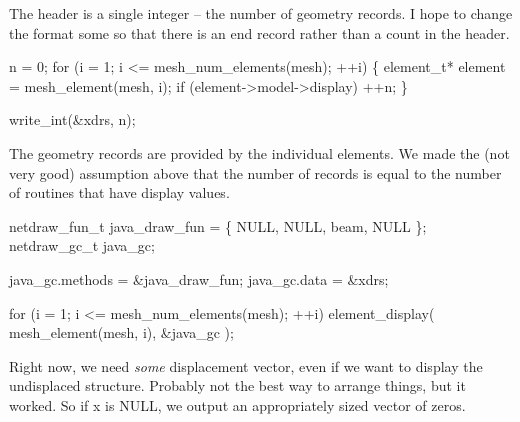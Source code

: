 The header is a single integer -- the number of geometry records.
I hope to change the format some so that there is an end record
rather than a count in the header.

\nwenddocs{}\endmoddef\nwstartdeflinemarkup{}\nwenddeflinemarkup
n = 0;
for (i = 1; i <= mesh_num_elements(mesh); ++i) \{
    element_t* element = mesh_element(mesh, i);
    if (element->model->display)
        ++n;
\}

write_int(&xdrs, n);

\nwendcode{}\nwdocspar

The geometry records are provided by the individual elements.
We made the (not very good) assumption above that the number
of records is equal to the number of routines that have display
values.

\nwenddocs{}\endmoddef\nwstartdeflinemarkup{}\nwenddeflinemarkup
netdraw_fun_t java_draw_fun = \{ NULL, NULL, beam, NULL \};
netdraw_gc_t  java_gc;

java_gc.methods = &java_draw_fun;
java_gc.data    = &xdrs;
\nwendcode{}\nwdocspar

\nwenddocs{}\endmoddef\nwstartdeflinemarkup{}\nwenddeflinemarkup
for (i = 1; i <= mesh_num_elements(mesh); ++i)
    element_display( mesh_element(mesh, i), &java_gc );

\nwendcode{}\nwdocspar

Right now, we need \emph{some} displacement vector, even if
we want to display the undisplaced structure.  Probably not
the best way to arrange things, but it worked.  So if {\Tt{}x\nwendquote}
is NULL, we output an appropriately sized vector of zeros.

